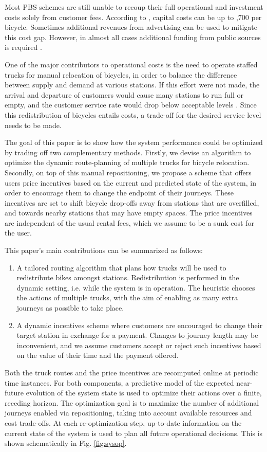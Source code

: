 \documentclass{article}
\begin{document}
Most PBS schemes are still unable to recoup their full operational and
investment costs solely from customer fees. According to
\cite{midgley2011bicycle}, capital costs can be up to \1,700 per bicycle. Sometimes additional
revenues from advertising can be used to mitigate this cost gap. However, in
almost all cases additional funding from public sources is required
\cite{shaheen_bikesharing_2010,wang2010bike}.

One of the major contributors to operational costs is the need to operate
staffed trucks for manual relocation of bicycles, in order to balance the
difference between supply and demand at various stations. If this effort were
not made, the arrival and departure of customers would cause many stations to
run full or empty, and the customer service rate would drop below acceptable
levels \cite{vogel_modeling_2010,obis_optimising_2011}. Since this
redistribution of bicycles entails costs, a trade-off for the desired service
level needs to be made.

The goal of this paper is to show how the system performance could be optimized
by trading off two complementary methods. Firstly, we devise an algorithm to
optimize the dynamic route-planning of multiple trucks for bicycle relocation.
Secondly, on top of this manual repositioning, we propose a scheme that offers
users price incentives based on the current and predicted state of the system, in
order to encourage them to change the endpoint of their journeys. These
incentives are set to shift bicycle drop-offs away from stations that are
overfilled, and towards nearby stations that may have empty spaces. The price
incentives are independent of the usual rental fees, which we assume to be a
sunk cost for the user.

This paper's main contributions can be summarized as follows:
\begin{enumerate}
\item A tailored routing algorithm that plans how trucks will be used to
  redistribute bikes amongst stations. Redistribution is performed in the
  dynamic setting, i.e. while the system is in operation. The heuristic
  chooses the actions of multiple trucks, with the aim of enabling as many extra
  journeys as possible to take place.
\item A dynamic incentives scheme where customers are encouraged to change their
  target station in exchange for a payment. Changes to journey length may be
  inconvenient, and we assume customers accept or reject such incentives based
  on the value of their time and the payment offered.
\end{enumerate}
Both the truck routes and the price incentives are recomputed online at periodic
time instances. For both components, a predictive model of the expected
near-future evolution of the system state is used to optimize their actions over
a finite, receding horizon. The optimization goal is to maximize the number of
additional journeys enabled via repositioning, taking into account available
resources and cost trade-offs. At each re-optimization step, up-to-date
information on the current state of the system is used to plan all future
operational decisions. This is shown schematically in Fig. \ref{fig:sysop}.
\end{document}
